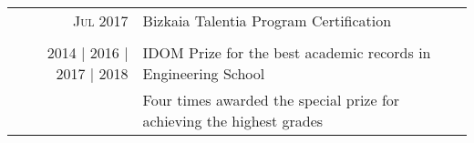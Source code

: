 \documentclass[a4paper,10pt]{article}
\begin{document}
\begin{tabular}{rp{13.6cm}}
\textsc{Jul} 2017 & Bizkaia Talentia Program Certification \\%
\vspace{-0.05in}&\\

2014 | 2016 | 2017 | 2018 & IDOM Prize for the best academic records in Engineering School\\%
&\footnotesize{Four times awarded the special prize for achieving the highest grades} \\
\end{tabular}
 

\end{document}
